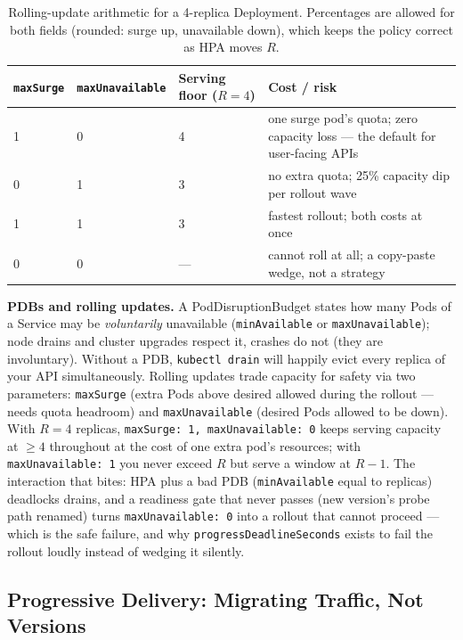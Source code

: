 \begin{table}[h]
  \centering
  \small
  \begin{tabularx}{\textwidth}{l l l X}
    \toprule
    \textbf{\texttt{maxSurge}} & \textbf{\texttt{maxUnavailable}} & \textbf{Serving floor ($R{=}4$)} & \textbf{Cost / risk} \\
    \midrule
    1 & 0 & 4 & one surge pod's quota; zero capacity loss --- the default for user-facing APIs \\
    0 & 1 & 3 & no extra quota; 25\% capacity dip per rollout wave \\
    1 & 1 & 3 & fastest rollout; both costs at once \\
    0 & 0 & --- & cannot roll at all; a copy-paste wedge, not a strategy \\
    \bottomrule
  \end{tabularx}
  \caption{Rolling-update arithmetic for a 4-replica Deployment.
  Percentages are allowed for both fields (rounded: surge up,
  unavailable down), which keeps the policy correct as HPA moves $R$.}
  \label{tab:ch17-rollout}
\end{table}

\textbf{PDBs and rolling updates.} A PodDisruptionBudget states how many
Pods of a Service may be \emph{voluntarily} unavailable
(\texttt{minAvailable} or \texttt{maxUnavailable}); node drains and
cluster upgrades respect it, crashes do not (they are involuntary).
Without a PDB, \texttt{kubectl drain} will happily evict every replica
of your API simultaneously. Rolling updates trade capacity for safety via
two parameters: \texttt{maxSurge} (extra Pods above desired allowed
during the rollout --- needs quota headroom) and
\texttt{maxUnavailable} (desired Pods allowed to be down). With $R{=}4$
replicas, \texttt{maxSurge: 1, maxUnavailable: 0} keeps serving capacity
at $\ge 4$ throughout at the cost of one extra pod's resources; with
\texttt{maxUnavailable: 1} you never exceed $R$ but serve a window at
$R{-}1$. The interaction that bites: HPA plus a bad PDB
(\texttt{minAvailable} equal to replicas) deadlocks drains, and a
readiness gate that never passes (new version's probe path renamed)
turns \texttt{maxUnavailable: 0} into a rollout that cannot proceed ---
which is the safe failure, and why \texttt{progressDeadlineSeconds}
exists to fail the rollout loudly instead of wedging it silently.

\subsection{Progressive Delivery: Migrating Traffic, Not Versions}
\label{sec:ch17-progressive}

